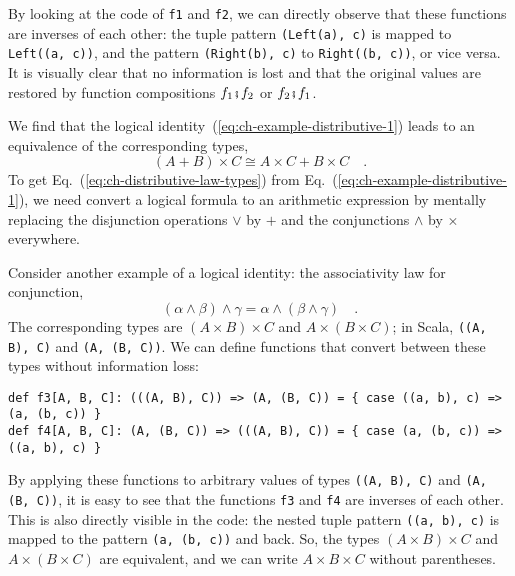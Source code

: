 By looking at the code of \lstinline!f1! and \lstinline!f2!, we
can directly observe that these functions are inverses of each other:
the tuple pattern \lstinline!(Left(a), c)! is mapped to \lstinline!Left((a, c))!,
and the pattern \lstinline!(Right(b), c)! to \lstinline!Right((b, c))!,
or vice versa. It is visually clear that no information is lost and
that the original values are restored by function compositions $f_{1}\bef f_{2}$
or $f_{2}\bef f_{1}$.

We find that the logical identity~(\ref{eq:ch-example-distributive-1})
leads to an equivalence of the corresponding types,
\begin{equation}
\left(A+B\right)\times C\cong A\times C+B\times C\quad.\label{eq:ch-distributive-law-types}
\end{equation}
To get Eq.~(\ref{eq:ch-distributive-law-types}) from Eq.~(\ref{eq:ch-example-distributive-1}),
we need convert a logical formula to an arithmetic expression by mentally
replacing the disjunction operations $\vee$ by $+$ and the conjunctions
$\wedge$ by $\times$ everywhere.

Consider another example of a logical identity: the associativity
law for conjunction,
\begin{equation}
\left(\alpha\wedge\beta\right)\wedge\gamma=\alpha\wedge\left(\beta\wedge\gamma\right)\quad.\label{eq:ch-example-associativity-conjunction}
\end{equation}
The corresponding types are $(A\times B)\times C$ and $A\times(B\times C)$;
in Scala, \lstinline!((A, B), C)! and \lstinline!(A, (B, C))!. We
can define functions that convert between these types without information
loss:
\begin{lstlisting}
def f3[A, B, C]: (((A, B), C)) => (A, (B, C)) = { case ((a, b), c) => (a, (b, c)) }
def f4[A, B, C]: (A, (B, C)) => (((A, B), C)) = { case (a, (b, c)) => ((a, b), c) }
\end{lstlisting}
By applying these functions to arbitrary values of types \lstinline!((A, B), C)!
and \lstinline!(A, (B, C))!, it is easy to see that the functions
\lstinline!f3! and \lstinline!f4! are inverses of each other. This
is also directly visible in the code: the nested tuple pattern \lstinline!((a, b), c)!
is mapped to the pattern \lstinline!(a, (b, c))! and back. So, the
types $\left(A\times B\right)\times C$ and $A\times\left(B\times C\right)$
are equivalent, and we can write $A\times B\times C$ without parentheses.

